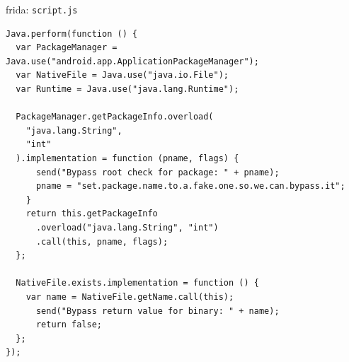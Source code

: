 \documentclass{beamer}
\begin{document}
\begin{frame}[fragile]{frida: \texttt{script.js}} 
\begin{verbatim}
Java.perform(function () {
  var PackageManager = Java.use("android.app.ApplicationPackageManager");
  var NativeFile = Java.use("java.io.File");
  var Runtime = Java.use("java.lang.Runtime");

  PackageManager.getPackageInfo.overload(
    "java.lang.String",
    "int"
  ).implementation = function (pname, flags) {
      send("Bypass root check for package: " + pname);
      pname = "set.package.name.to.a.fake.one.so.we.can.bypass.it";
    }
    return this.getPackageInfo
      .overload("java.lang.String", "int")
      .call(this, pname, flags);
  };

  NativeFile.exists.implementation = function () {
    var name = NativeFile.getName.call(this);
      send("Bypass return value for binary: " + name);
      return false;
  };
});

\end{verbatim}


\end{frame}
\end{document}
